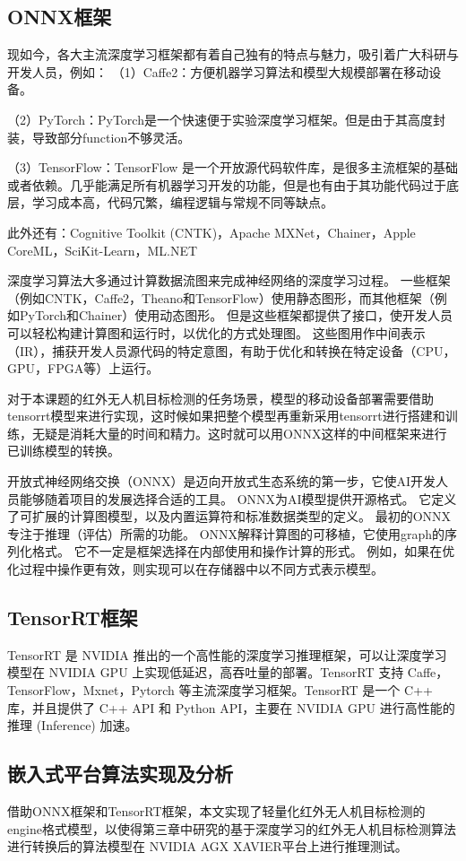 \subsection{ONNX框架}
现如今，各大主流深度学习框架都有着自己独有的特点与魅力，吸引着广大科研与开发人员，例如：
（1）Caffe2：方便机器学习算法和模型大规模部署在移动设备。

（2）PyTorch：PyTorch是一个快速便于实验深度学习框架。但是由于其高度封装，导致部分function不够灵活。

（3）TensorFlow：TensorFlow 是一个开放源代码软件库，是很多主流框架的基础或者依赖。几乎能满足所有机器学习开发的功能，但是也有由于其功能代码过于底层，学习成本高，代码冗繁，编程逻辑与常规不同等缺点。

此外还有：Cognitive Toolkit (CNTK)，Apache MXNet，Chainer，Apple CoreML，SciKit-Learn，ML.NET

深度学习算法大多通过计算数据流图来完成神经网络的深度学习过程。 一些框架（例如CNTK，Caffe2，Theano和TensorFlow）使用静态图形，而其他框架（例如PyTorch和Chainer）使用动态图形。 但是这些框架都提供了接口，使开发人员可以轻松构建计算图和运行时，以优化的方式处理图。 这些图用作中间表示（IR），捕获开发人员源代码的特定意图，有助于优化和转换在特定设备（CPU，GPU，FPGA等）上运行。

对于本课题的红外无人机目标检测的任务场景，模型的移动设备部署需要借助tensorrt模型来进行实现，这时候如果把整个模型再重新采用tensorrt进行搭建和训练，无疑是消耗大量的时间和精力。这时就可以用ONNX这样的中间框架来进行已训练模型的转换。

开放式神经网络交换（ONNX）是迈向开放式生态系统的第一步，它使AI开发人员能够随着项目的发展选择合适的工具。 ONNX为AI模型提供开源格式。 它定义了可扩展的计算图模型，以及内置运算符和标准数据类型的定义。 最初的ONNX专注于推理（评估）所需的功能。 ONNX解释计算图的可移植，它使用graph的序列化格式。 它不一定是框架选择在内部使用和操作计算的形式。 例如，如果在优化过程中操作更有效，则实现可以在存储器中以不同方式表示模型。

\subsection{TensorRT框架}
TensorRT 是 NVIDIA 推出的一个高性能的深度学习推理框架，可以让深度学习模型在 NVIDIA GPU 上实现低延迟，高吞吐量的部署。TensorRT 支持 Caffe，TensorFlow，Mxnet，Pytorch 等主流深度学习框架。TensorRT 是一个 C++ 库，并且提供了 C++ API 和 Python API，主要在 NVIDIA GPU 进行高性能的推理 (Inference) 加速。

\subsection{嵌入式平台算法实现及分析}
借助ONNX框架和TensorRT框架，本文实现了轻量化红外无人机目标检测的engine格式模型，以使得第三章中研究的基于深度学习的红外无人机目标检测算法进行转换后的算法模型在 NVIDIA AGX XAVIER平台上进行推理测试。

